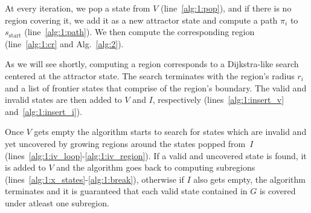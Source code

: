 \documentclass[letterpaper, 10 pt, conference]{ieeeconf}  %
\newcommand{\sStart}{\ensuremath{s_{\text{start}}\xspace}}
\begin{document}
At every iteration, we pop a state from $V$ (line~\ref{alg:1:pop}), and if there is no region covering it, we add it as a new attractor state and compute a path $\pi_i$ to $\sStart$ (line~\ref{alg:1:path}).
We then compute the corresponding region (line~\ref{alg:1:cr} and Alg.~\ref{alg:2}).

As we will see shortly, computing a region corresponds to a Dijkstra-like search centered at the attractor state.
The search terminates with the region's radius $r_i$ and a list of frontier states that comprise of the region's boundary.
The valid and invalid states are then added to $V$ and $I$, respectively (lines~\ref{alg:1:insert_v} and~\ref{alg:1:insert_i}).


Once $V$ gets empty the algorithm starts to search for states which are invalid and yet uncovered by growing regions around the states popped from~$I$ (lines~\ref{alg:1:iv_loop}-\ref{alg:1:iv_region}). If a valid and uncovered state is found, it is added to $V$ and the algorithm goes back to computing subregions (lines~\ref{alg:1:x_states}-\ref{alg:1:break}), otherwise if $I$ also gets empty, the algorithm terminates and it is guaranteed that each valid state contained in $G$ is covered under atleast one subregion.

\end{document}
